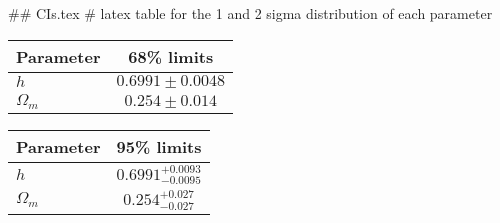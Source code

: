 ## CIs.tex
# latex table for the 1 and 2 sigma distribution of each parameter

\begin{tabular} { l  c}
 Parameter &  68\% limits\\
\hline
{\boldmath$h              $} & $0.6991\pm 0.0048          $\\
{\boldmath$\Omega_m       $} & $0.254\pm 0.014            $\\
\hline
\end{tabular}

\begin{tabular} { l  c}
 Parameter &  95\% limits\\
\hline
{\boldmath$h              $} & $0.6991^{+0.0093}_{-0.0095}$\\
{\boldmath$\Omega_m       $} & $0.254^{+0.027}_{-0.027}   $\\
\hline
\end{tabular}
